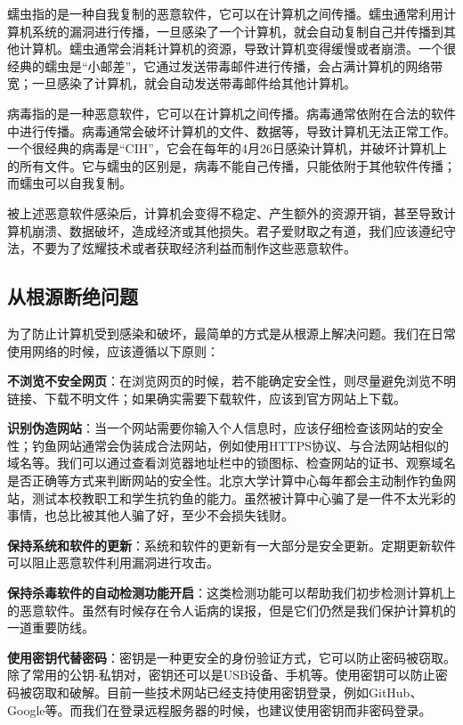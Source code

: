 \documentclass[../main.tex]{subfiles}
\begin{document}
蠕虫指的是一种自我复制的恶意软件，它可以在计算机之间传播。蠕虫通常利用计算机系统的漏洞进行传播，一旦感染了一个计算机，就会自动复制自己并传播到其他计算机。蠕虫通常会消耗计算机的资源，导致计算机变得缓慢或者崩溃。一个很经典的蠕虫是“小邮差”，它通过发送带毒邮件进行传播，会占满计算机的网络带宽；一旦感染了计算机，就会自动发送带毒邮件给其他计算机。

病毒指的是一种恶意软件，它可以在计算机之间传播。病毒通常依附在合法的软件中进行传播。病毒通常会破坏计算机的文件、数据等，导致计算机无法正常工作。一个很经典的病毒是“CIH”，它会在每年的4月26日感染计算机，并破坏计算机上的所有文件。它与蠕虫的区别是，病毒不能自己传播，只能依附于其他软件传播；而蠕虫可以自我复制。

被上述恶意软件感染后，计算机会变得不稳定、产生额外的资源开销，甚至导致计算机崩溃、数据破坏，造成经济或其他损失。君子爱财取之有道，我们应该遵纪守法，不要为了炫耀技术或者获取经济利益而制作这些恶意软件。

\subsection{从根源断绝问题}

为了防止计算机受到感染和破坏，最简单的方式是从根源上解决问题。我们在日常使用网络的时候，应该遵循以下原则：

\textbf{不浏览不安全网页}：在浏览网页的时候，若不能确定安全性，则尽量避免浏览不明链接、下载不明文件；如果确实需要下载软件，应该到官方网站上下载。

\textbf{识别伪造网站}：当一个网站需要你输入个人信息时，应该仔细检查该网站的安全性；钓鱼网站通常会伪装成合法网站，例如使用HTTPS协议、与合法网站相似的域名等。我们可以通过查看浏览器地址栏中的锁图标、检查网站的证书、观察域名是否正确等方式来判断网站的安全性。北京大学计算中心每年都会主动制作钓鱼网站，测试本校教职工和学生抗钓鱼的能力。虽然被计算中心骗了是一件不太光彩的事情，也总比被其他人骗了好，至少不会损失钱财。

\textbf{保持系统和软件的更新}：系统和软件的更新有一大部分是安全更新。定期更新软件可以阻止恶意软件利用漏洞进行攻击。

\textbf{保持杀毒软件的自动检测功能开启}：这类检测功能可以帮助我们初步检测计算机上的恶意软件。虽然有时候存在令人诟病的误报，但是它们仍然是我们保护计算机的一道重要防线。

\textbf{使用密钥代替密码}：密钥是一种更安全的身份验证方式，它可以防止密码被窃取。除了常用的公钥-私钥对，密钥还可以是USB设备、手机等。使用密钥可以防止密码被窃取和破解。目前一些技术网站已经支持使用密钥登录，例如GitHub、Google等。而我们在登录远程服务器的时候，也建议使用密钥而非密码登录。
\end{document}
